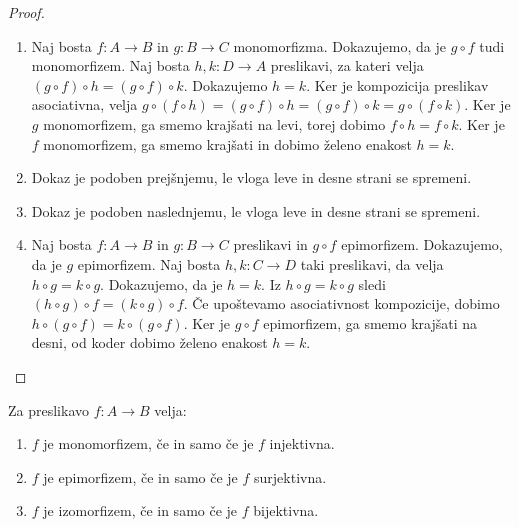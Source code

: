 \begin{proof}
  \begin{enumerate}
  \item Naj bosta $f : A \to B$ in $g : B \to C$ monomorfizma. Dokazujemo, da je
    $g \circ f$ tudi monomorfizem. Naj bosta $h, k : D \to A$ preslikavi, za kateri velja
    $(g \circ f) \circ h = (g \circ f) \circ k$. Dokazujemo $h = k$. Ker je kompozicija
    preslikav asociativna, velja
    $g \circ (f \circ h) = (g \circ f) \circ h = (g \circ f) \circ k = g \circ (f \circ k)$.
    Ker je $g$ monomorfizem, ga smemo krajšati na levi, torej dobimo
    $f \circ h = f \circ k$. Ker je $f$ monomorfizem, ga smemo krajšati in dobimo želeno
    enakost $h = k$.

  \item Dokaz je podoben prejšnjemu, le vloga leve in desne strani se spremeni.

  \item Dokaz je podoben naslednjemu, le vloga leve in desne strani se spremeni.

  \item Naj bosta $f : A \to B$ in $g : B \to C$ preslikavi in $g \circ f$ epimorfizem.
    Dokazujemo, da je $g$ epimorfizem. Naj bosta $h, k : C \to D$ taki preslikavi, da
    velja $h \circ g = k \circ g$. Dokazujemo, da je $h = k$. Iz $h \circ g = k \circ g$
    sledi $(h \circ g) \circ f = (k \circ g) \circ f$. Če upoštevamo asociativnost
    kompozicije, dobimo $h \circ (g \circ f) = k \circ (g \circ f)$. Ker je $g \circ f$
    epimorfizem, ga smemo krajšati na desni, od koder dobimo želeno enakost $h = k$.
  \end{enumerate}
\end{proof}

\begin{izrek}
  Za preslikavo $f : A \to B$ velja:
  \begin{enumerate}
  \item $f$ je monomorfizem, če in samo če je $f$ injektivna.
  \item $f$ je epimorfizem, če in samo če je $f$ surjektivna.
  \item $f$ je izomorfizem, če in samo če je $f$ bijektivna.
  \end{enumerate}
\end{izrek}


